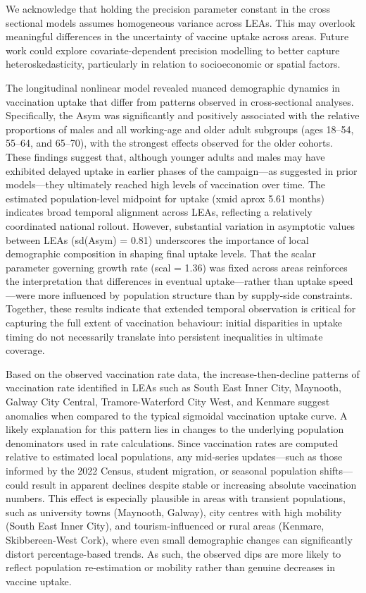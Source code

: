 \documentclass{article}
\begin{document}
We acknowledge that holding the precision parameter constant in the
cross sectional models assumes homogeneous variance across LEAs. This
may overlook meaningful differences in the uncertainty of vaccine uptake
across areas. Future work could explore covariate-dependent precision
modelling to better capture heteroskedasticity, particularly in relation
to socioeconomic or spatial factors.

The longitudinal nonlinear model revealed nuanced demographic dynamics
in vaccination uptake that differ from patterns observed in
cross-sectional analyses. Specifically, the Asym was significantly and
positively associated with the relative proportions of males and all
working-age and older adult subgroups (ages 18--54, 55--64, and 65--70),
with the strongest effects observed for the older cohorts. These
findings suggest that, although younger adults and males may have
exhibited delayed uptake in earlier phases of the campaign---as
suggested in prior models---they ultimately reached high levels of
vaccination over time. The estimated population-level midpoint for
uptake (xmid aprox 5.61 months) indicates broad temporal alignment
across LEAs, reflecting a relatively coordinated national rollout.
However, substantial variation in asymptotic values between LEAs
(sd(Asym) = 0.81) underscores the importance of local demographic
composition in shaping final uptake levels. That the scalar parameter
governing growth rate (scal = 1.36) was fixed across areas reinforces
the interpretation that differences in eventual uptake---rather than
uptake speed---were more influenced by population structure than by
supply-side constraints. Together, these results indicate that extended
temporal observation is critical for capturing the full extent of
vaccination behaviour: initial disparities in uptake timing do not
necessarily translate into persistent inequalities in ultimate coverage.

Based on the observed vaccination rate data, the increase-then-decline
patterns of vaccination rate identified in LEAs such as South East Inner
City, Maynooth, Galway City Central, Tramore-Waterford City West, and
Kenmare suggest anomalies when compared to the typical sigmoidal
vaccination uptake curve. A likely explanation for this pattern lies in
changes to the underlying population denominators used in rate
calculations. Since vaccination rates are computed relative to estimated
local populations, any mid-series updates---such as those informed by
the 2022 Census, student migration, or seasonal population
shifts---could result in apparent declines despite stable or increasing
absolute vaccination numbers. This effect is especially plausible in
areas with transient populations, such as university towns (Maynooth,
Galway), city centres with high mobility (South East Inner City), and
tourism-influenced or rural areas (Kenmare, Skibbereen-West Cork), where
even small demographic changes can significantly distort
percentage-based trends. As such, the observed dips are more likely to
reflect population re-estimation or mobility rather than genuine
decreases in vaccine uptake.
\end{document}

